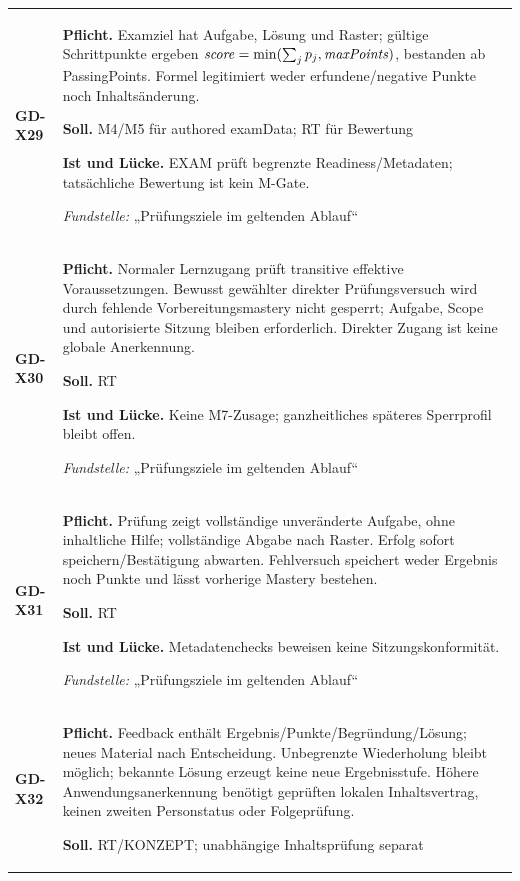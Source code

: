 \begin{longtable}{@{}P{20mm}P{128mm}@{}}
\label{rule:GD-X29}\textbf{GD-X29} &
\textbf{Pflicht.} Examziel hat Aufgabe, Lösung und Raster; gültige Schrittpunkte ergeben \(\mathit{score}=\min(\sum_j p_j,\mathit{maxPoints})\), bestanden ab PassingPoints. Formel legitimiert weder erfundene/negative Punkte noch Inhaltsänderung.\par\smallskip
\textbf{Soll.} M4/M5 für authored examData; RT für Bewertung\par\smallskip
\textbf{Ist und Lücke.} EXAM prüft begrenzte Readiness/Metadaten; tatsächliche Bewertung ist kein M-Gate.\par\smallskip
\emph{Fundstelle:} „Prüfungsziele im geltenden Ablauf“\\\addlinespace[5pt]
\label{rule:GD-X30}\textbf{GD-X30} &
\textbf{Pflicht.} Normaler Lernzugang prüft transitive effektive Voraussetzungen. Bewusst gewählter direkter Prüfungsversuch wird durch fehlende Vorbereitungsmastery nicht gesperrt; Aufgabe, Scope und autorisierte Sitzung bleiben erforderlich. Direkter Zugang ist keine globale Anerkennung.\par\smallskip
\textbf{Soll.} RT\par\smallskip
\textbf{Ist und Lücke.} Keine M7-Zusage; ganzheitliches späteres Sperrprofil bleibt offen.\par\smallskip
\emph{Fundstelle:} „Prüfungsziele im geltenden Ablauf“\\\addlinespace[5pt]
\label{rule:GD-X31}\textbf{GD-X31} &
\textbf{Pflicht.} Prüfung zeigt vollständige unveränderte Aufgabe, ohne inhaltliche Hilfe; vollständige Abgabe nach Raster. Erfolg sofort speichern/Bestätigung abwarten. Fehlversuch speichert weder Ergebnis noch Punkte und lässt vorherige Mastery bestehen.\par\smallskip
\textbf{Soll.} RT\par\smallskip
\textbf{Ist und Lücke.} Metadatenchecks beweisen keine Sitzungskonformität.\par\smallskip
\emph{Fundstelle:} „Prüfungsziele im geltenden Ablauf“\\\addlinespace[5pt]
\label{rule:GD-X32}\textbf{GD-X32} &
\textbf{Pflicht.} Feedback enthält Ergebnis/Punkte/Begründung/Lösung; neues Material nach Entscheidung. Unbegrenzte Wiederholung bleibt möglich; bekannte Lösung erzeugt keine neue Ergebnisstufe. Höhere Anwendungsanerkennung benötigt geprüften lokalen Inhaltsvertrag, keinen zweiten Personstatus oder Folgeprüfung.\par\smallskip
\textbf{Soll.} RT/KONZEPT; unabhängige Inhaltsprüfung separat\par\smallskip

\end{longtable}
